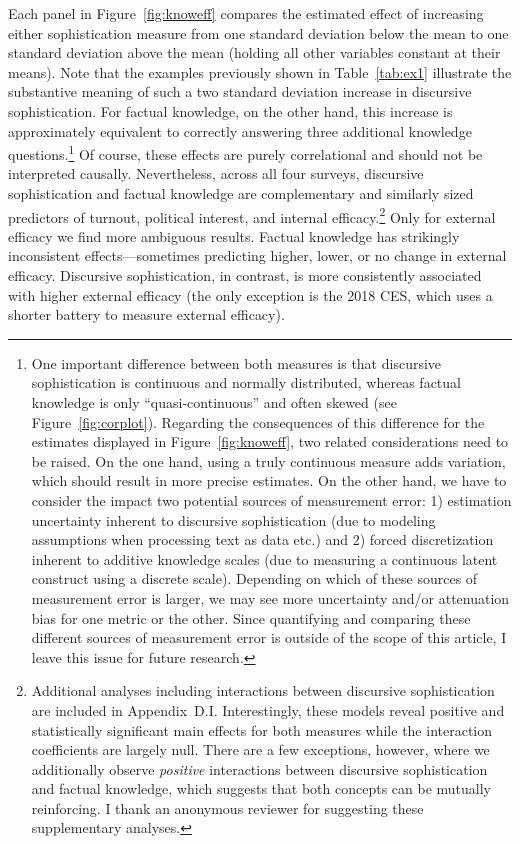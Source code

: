 Each panel in Figure~\ref{fig:knoweff} compares the estimated effect of increasing either sophistication measure from one standard deviation below the mean to one standard deviation above the mean (holding all other variables constant at their means). Note that the examples previously shown in Table~\ref{tab:ex1} illustrate the substantive meaning of such a two standard deviation increase in discursive sophistication. For factual knowledge, on the other hand, this increase is approximately equivalent to correctly answering three additional knowledge questions.\footnote{One important difference between both measures is that discursive sophistication is continuous and normally distributed, whereas factual knowledge is only ``quasi-continuous'' and often skewed (see Figure~\ref{fig:corplot}). Regarding the consequences of this difference for the estimates displayed in Figure~\ref{fig:knoweff}, two related considerations need to be raised. On the one hand, using a truly continuous measure adds variation, which should result in more precise estimates. On the other hand, we have to consider the impact two potential sources of measurement error: 1) estimation uncertainty inherent to discursive sophistication (due to modeling assumptions when processing text as data etc.) and 2) forced discretization inherent to additive knowledge scales (due to measuring a continuous latent construct using a discrete scale). Depending on which of these sources of measurement error is larger, we may see more uncertainty and/or attenuation bias for one metric or the other. Since quantifying and comparing these different sources of measurement error is outside of the scope of this article, I leave this issue for future research.\label{fn:distributions}} Of course, these effects are purely correlational and should not be interpreted causally. Nevertheless, across all four surveys, discursive sophistication and factual knowledge are complementary and similarly sized predictors of turnout, political interest, and internal efficacy.\footnote{Additional analyses including interactions between discursive sophistication are included in Appendix~D.I. Interestingly, these models reveal positive and statistically significant main effects for both measures while the interaction coefficients are largely null. There are a few exceptions, however, where we additionally observe \textit{positive} interactions between discursive sophistication and factual knowledge, which suggests that both concepts can be mutually reinforcing. I thank an anonymous reviewer for suggesting these supplementary analyses.\label{fn:interaction}} Only for external efficacy we find more ambiguous results. Factual knowledge has strikingly inconsistent effects---sometimes predicting higher, lower, or no change in external efficacy. Discursive sophistication, in contrast, is more consistently associated with higher external efficacy (the only exception is the 2018 CES, which uses a shorter battery to measure external efficacy).

